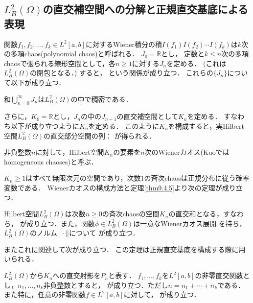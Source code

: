 \subsection{$L^2_B(\Omega)$の直交補空間への分解と正規直交基底による表現}
関数$f_1,f_2,...,f_k\in L^2[a,b]$に対するWiener積分の積$I(f_1)I(f_2)\cdots I(f_k)$は$k$次の多項chaos(polynomial chaos)と呼ばれる．
$J_0=\mathbb{R}$とし，
定数と$k\le n$次の多項chaosで張られる線形空間として，各$n\ge 1$に対する$J_n$を定める．
(これは$L^2_B(\Omega)$の閉包となる．)%
すると，
という関係が成り立つ．
これらの$\{J_n\}$について以下が成り立つ．
\begin{theorem}\label{thm9.4.5}%
和$\bigcup_{n=0}^\infty J_n$は$L^2_B(\Omega)$の中で稠密である．
\end{theorem}

さらに，$K_0=\mathbb{R}$とし，$J_n$の中の$J_{n-1}$の直交補空間として$K_n$を定める．
すなわち以下が成り立つように$K_n$を定める．
このように$K_n$を構成すると，実Hilbert空間$L^2_B(\Omega)$の直交部分空間の列：
が得られる．
\begin{definition}
非負整数$n$に対して，Hilbert空間$K_n$の要素を$n$次のWienerカオス(Kuo\cite{Kuo2006}ではhomogeneous chaoses)と呼ぶ．
\end{definition}
$K_n\ge 1$はすべて無限次元の空間であり，次数$1$の斉次chaosは正規分布に従う確率変数である．
Wienerカオスの構成方法と定理\ref{thm9.4.5}より次の定理が成り立つ．
\begin{theorem}\label{thm9.4.7}%
Hilbert空間$L^2_B(\Omega)$は次数$n\ge0$の斉次chaosの空間$K_n$の直交和となる，すなわち，
が成り立つ．また，関数$\phi\in L^2_B(\Omega)$は一意なWienerカオス展開
を持ち，$L^2_B(\Omega)$のノルム$||\cdot||$について
が成り立つ．
\end{theorem}
またこれに関連して次が成り立つ．
この定理は正規直交基底を構成する際に用いられる．
\begin{theorem}\label{thm9.4.9}%
$L^2_B(\Omega)$から$K_n$への直交射影を$P_n$と表す．
$f_1,...,f_k$を$L^2[a,b]$の非零直交関数とし，$n_1,...,n_k$非負整数とすると，
が成り立つ．ただし$n=n_1+\cdots+n_k$である．
また特に，任意の非零関数$f\in L^2[a,b]$に対して，
が成り立つ．
\end{theorem}

